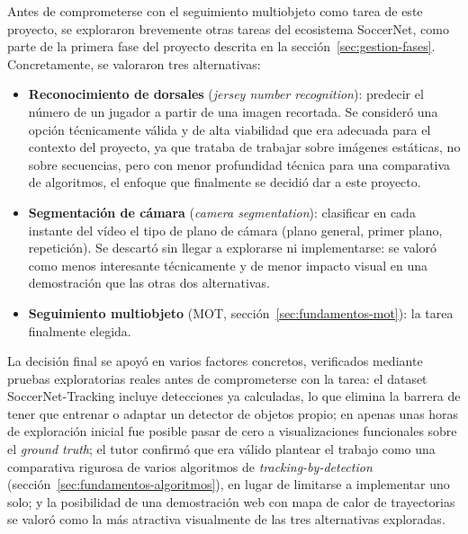 Antes de comprometerse con el seguimiento multiobjeto como tarea de este
proyecto, se exploraron brevemente otras tareas del ecosistema SoccerNet, como parte de la primera fase del
proyecto descrita en la sección~\ref{sec:gestion-fases}. Concretamente, se
valoraron tres alternativas:

\begin{itemize}
  \item \textbf{Reconocimiento de dorsales} (\emph{jersey number
        recognition}): predecir el número de un jugador a partir de una
        imagen recortada. Se consideró una opción técnicamente válida y de
        alta viabilidad que era adecuada para el contexto del proyecto, ya
        que trataba de trabajar sobre imágenes estáticas, no sobre
        secuencias, pero con menor profundidad técnica para una
        comparativa de algoritmos, el enfoque que finalmente se decidió dar
        a este proyecto.
  \item \textbf{Segmentación de cámara} (\emph{camera segmentation}):
        clasificar en cada instante del vídeo el tipo de plano de cámara
        (plano general, primer plano, repetición). Se descartó sin llegar a
        explorarse ni implementarse: se valoró como menos interesante
        técnicamente y de menor impacto visual en una demostración que las
        otras dos alternativas.
  \item \textbf{Seguimiento multiobjeto} (MOT, sección~\ref{sec:fundamentos-mot}):
        la tarea finalmente elegida.
\end{itemize}

La decisión final se apoyó en varios factores concretos, verificados
mediante pruebas exploratorias reales antes de comprometerse con la tarea:
el dataset SoccerNet-Tracking incluye detecciones ya calculadas, lo
que elimina la barrera de tener que entrenar o adaptar un detector de
objetos propio; en apenas unas horas de exploración inicial fue posible
pasar de cero a visualizaciones funcionales sobre el \emph{ground truth}; el
tutor confirmó que era válido plantear el trabajo como una comparativa
rigurosa de varios algoritmos de \emph{tracking-by-detection}
(sección~\ref{sec:fundamentos-algoritmos}), en lugar de limitarse a
implementar uno solo; y la posibilidad de una demostración web con mapa de
calor de trayectorias se valoró como la más atractiva visualmente de las
tres alternativas exploradas.

